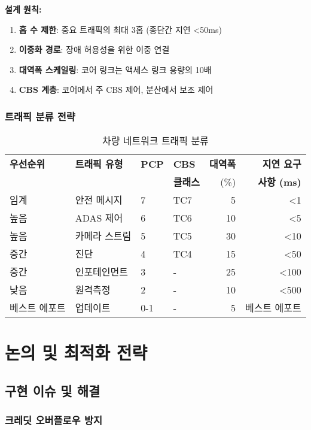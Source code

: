 \documentclass[twocolumn,10pt]{article}
\begin{document}
\textbf{설계 원칙:}
\begin{enumerate}
    \item \textbf{홉 수 제한}: 중요 트래픽의 최대 3홉 (종단간 지연 <50ms)
    \item \textbf{이중화 경로}: 장애 허용성을 위한 이중 연결
    \item \textbf{대역폭 스케일링}: 코어 링크는 액세스 링크 용량의 10배
    \item \textbf{CBS 계층}: 코어에서 주 CBS 제어, 분산에서 보조 제어
\end{enumerate}

\subsubsection{트래픽 분류 전략}

\begin{table}[h]
\centering
\caption{차량 네트워크 트래픽 분류}
\label{tab:traffic_classification_kr}
\begin{tabular}{llllrr}
\toprule
\textbf{우선순위} & \textbf{트래픽 유형} & \textbf{PCP} & \textbf{CBS} & \textbf{대역폭} & \textbf{지연 요구} \\
 & & & \textbf{클래스} & (\%) & \textbf{사항 (ms)} \\
\midrule
임계 & 안전 메시지 & 7 & TC7 & 5 & <1 \\
높음 & ADAS 제어 & 6 & TC6 & 10 & <5 \\
높음 & 카메라 스트림 & 5 & TC5 & 30 & <10 \\
중간 & 진단 & 4 & TC4 & 15 & <50 \\
중간 & 인포테인먼트 & 3 & - & 25 & <100 \\
낮음 & 원격측정 & 2 & - & 10 & <500 \\
베스트 에포트 & 업데이트 & 0-1 & - & 5 & 베스트 에포트 \\
\bottomrule
\end{tabular}
\end{table}

\section{논의 및 최적화 전략}
\label{sec:discussion}

\subsection{구현 이슈 및 해결}

\subsubsection{크레딧 오버플로우 방지}
\end{document}
